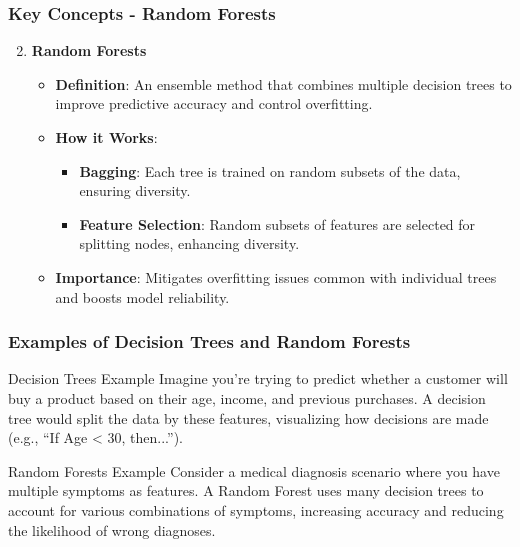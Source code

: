 \documentclass[aspectratio=169]{beamer}
\begin{document}
\begin{frame}[fragile]
    \frametitle{Key Concepts - Random Forests}
    \begin{enumerate}
        \setcounter{enumi}{1}
        \item \textbf{Random Forests}
        \begin{itemize}
            \item \textbf{Definition}: An ensemble method that combines multiple decision trees to improve predictive accuracy and control overfitting.
            \item \textbf{How it Works}:
            \begin{itemize}
                \item \textbf{Bagging}: Each tree is trained on random subsets of the data, ensuring diversity.
                \item \textbf{Feature Selection}: Random subsets of features are selected for splitting nodes, enhancing diversity.
            \end{itemize}
            \item \textbf{Importance}: Mitigates overfitting issues common with individual trees and boosts model reliability.
        \end{itemize}
    \end{enumerate}
\end{frame}

\begin{frame}[fragile]
    \frametitle{Examples of Decision Trees and Random Forests}
    \begin{block}{Decision Trees Example}
        Imagine you’re trying to predict whether a customer will buy a product based on their age, income, and previous purchases. 
        A decision tree would split the data by these features, visualizing how decisions are made (e.g., “If Age < 30, then...”).
    \end{block}

    \begin{block}{Random Forests Example}
        Consider a medical diagnosis scenario where you have multiple symptoms as features. 
        A Random Forest uses many decision trees to account for various combinations of symptoms, increasing accuracy and reducing the likelihood of wrong diagnoses.
    \end{block}
\end{frame}
\end{document}
